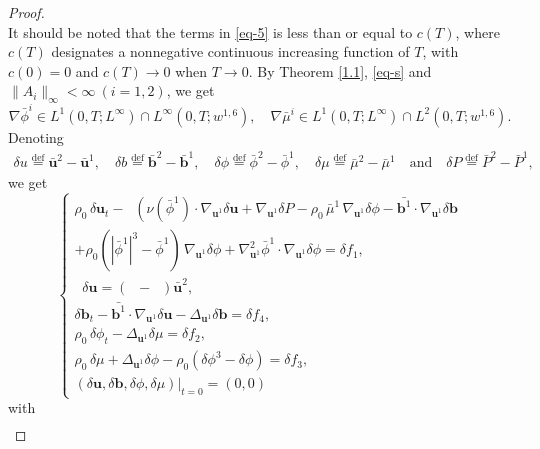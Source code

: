 \documentclass[11pt]{article}
\numberwithin{equation}{section}
\begin{document}
\begin{proof}
\begin{equation}
\end{equation}
It should be noted that the terms in \eqref{eq-5} is less than or equal to \( c(T) \), where \( c(T) \) designates a nonnegative continuous increasing function of \( T \), with \( c(0) = 0 \) and \( c(T) \to 0 \) when \( T \to 0 \). By Theorem \ref{1.1}, \eqref{eq-s} and $\|A_i\|_{\infty} < \infty\ (i = 1, 2)$, we get
$$\nabla \bar{\phi}^i \in L^1(0,T; L^\infty) \cap L^\infty(0,T; w^{1,6}) ,\quad
\nabla \bar{\mu}^i \in L^1(0,T; L^\infty) \cap L^2(0,T; w^{1,6}).$$
Denoting
\begin{align*}
\delta u \stackrel{\text{def}}{=} \bar{\mathbf{u}}^2 - \bar{\mathbf{u}}^1, \quad
\delta b \stackrel{\text{def}}{=} \bar{\mathbf{b}}^2 - \bar{\mathbf{b}}^1, \quad
\delta \phi \stackrel{\text{def}}{=} \bar{\phi}^2 - \bar{\phi}^1, \quad \delta\mu \stackrel{\text{def}}{=} \bar{\mu}^2 - \bar{\mu}^1
\quad\text{and} \quad \delta P \stackrel{\text{def}}{=} \bar{P}^2 - \bar{P}^1,
\end{align*}
we get
\begin{equation}
\begin{cases}
\rho_0 \, \delta \mathbf{u}_t - \mathop{\mathrm{div}_{\mathbf{u}^1}} \left( \nu(\bar{\phi}^1) \cdot \nabla_{\mathbf{u}^1} \delta \mathbf{u} + \nabla_{\mathbf{u}^1} \delta P \right.
- \rho_0 \, \bar{\mu}^1 \, \nabla_{\mathbf{u}^1} \delta \phi-\bar{\mathbf{b}^1}\cdot\nabla_{\mathbf{u}^1} \delta \mathbf{b}\\
+ \rho_0 \left( |\bar{\phi}^1|^3 - \bar{\phi}^1 \right) \, \nabla_{\mathbf{u}^1} \delta \phi
+ \nabla_{\mathbf{u}^1}^2 \bar{\phi}^1 \cdot \nabla_{\mathbf{u}^1} \delta \phi = \delta f_1, \\
\mathop{\mathrm{div}_{\mathbf{u}^1}} \delta \mathbf{u} = (\mathop{\mathrm{div}_{\mathbf{u}^1}} - \mathop{\mathrm{div}_{\mathbf{u}^2}}) \bar{\mathbf{u}}^2, \\
\delta \mathbf{b}_t -\bar{\mathbf{b}^1}\cdot\nabla_{\mathbf{u}^1} \delta \mathbf{u}-\Delta_{\mathbf{u}^1}\delta \mathbf{b}=\delta f_4,\\
\rho_0 \, \delta \phi_t - \Delta_{\mathbf{u}^1} \delta \mu = \delta f_2, \\
\rho_0 \, \delta \mu + \Delta_{\mathbf{u}^1} \delta \phi - \rho_0 \left( \delta \phi^3 - \delta \phi \right) = \delta f_3, \\
(\delta \mathbf{u}, \delta \mathbf{b}, \delta \phi, \delta \mu) \big\vert_{t=0}= (0, 0)
\end{cases}
\end{equation}
with
\begin{align*}

\end{align*}
\end{proof}
\end{document}
